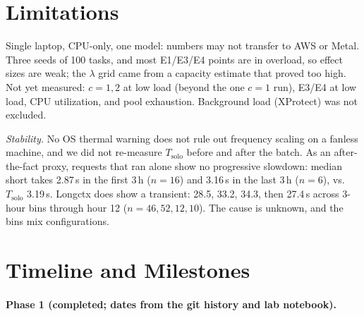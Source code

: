 \documentclass{article}
\begin{document}
\section{Limitations}
Single laptop, CPU-only, one model: numbers may not transfer to AWS or Metal. Three seeds of 100 tasks, and most E1/E3/E4 points are in overload, so effect sizes are weak; the $\lambda$ grid came from a capacity estimate that proved too high. Not yet measured: $c{=}1,2$ at low load (beyond the one $c{=}1$ run), E3/E4 at low load, CPU utilization, and pool exhaustion. Background load (XProtect) was not excluded.

\emph{Stability.} No OS thermal warning does not rule out frequency scaling on a fanless machine, and we did not re-measure $T_{\mathrm{solo}}$ before and after the batch. As an after-the-fact proxy, requests that ran alone show no progressive slowdown: median short takes 2.87\,s in the first 3\,h ($n{=}16$) and 3.16\,s in the last 3\,h ($n{=}6$), vs.\ $T_{\mathrm{solo}}$ 3.19\,s. Longctx does show a transient: 28.5, 33.2, 34.3, then 27.4\,s across 3-hour bins through hour 12 ($n{=}46,52,12,10$). The cause is unknown, and the bins mix configurations.

\appendix
\raggedbottom
\renewcommand{\thesection}{Appendix \Alph{section}}
\onecolumn
\section{Timeline and Milestones}
\label{app:timeline}
\paragraph{Phase 1 (completed; dates from the git history and lab notebook).}
\end{document}
